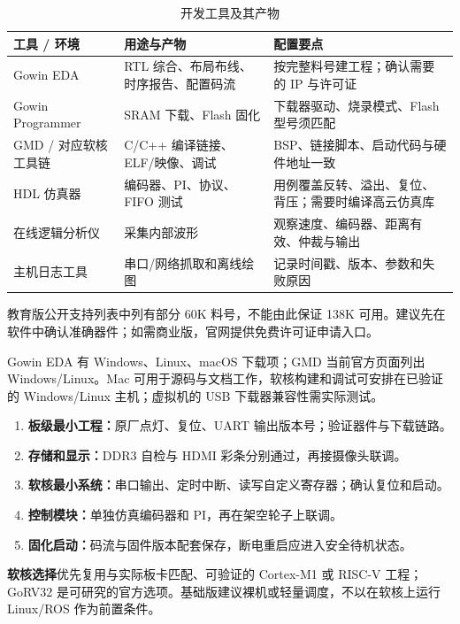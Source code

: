 \documentclass[UTF8,a4paper,zihao=-4,fontset=fandol]{ctexart}
\newcommand{\note}[2]{\par\smallskip\noindent\colorbox{Pale}{\parbox{\dimexpr\linewidth-2\fboxsep\relax}{\small\textbf{\color{Teal}#1}\quad #2}}\par\smallskip}
\begin{document}
\begin{table}[H]\small
\caption{开发工具及其产物}
\begin{tabularx}{\linewidth}{@{}L{3.4cm}Y Y@{}}\toprule
\textbf{工具 / 环境} & \textbf{用途与产物} & \textbf{配置要点}\\\midrule
Gowin EDA & RTL 综合、布局布线、时序报告、配置码流 & 按完整料号建工程；确认需要的 IP 与许可证\\
Gowin Programmer & SRAM 下载、Flash 固化 & 下载器驱动、烧录模式、Flash 型号须匹配\\
GMD / 对应软核工具链 & C/C++ 编译链接、ELF/映像、调试 & BSP、链接脚本、启动代码与硬件地址一致\\
HDL 仿真器 & 编码器、PI、协议、FIFO 测试 & 用例覆盖反转、溢出、复位、背压；需要时编译高云仿真库\\
在线逻辑分析仪 & 采集内部波形 & 观察速度、编码器、距离有效、仲裁与输出\\
主机日志工具 & 串口/网络抓取和离线绘图 & 记录时间戳、版本、参数和失败原因\\\bottomrule
\end{tabularx}
\end{table}

教育版公开支持列表中列有部分 60K 料号，不能由此保证 138K 可用。建议先在软件中确认准确器件；如需商业版，官网提供免费许可证申请入口。\cite{education,eda}

Gowin EDA 有 Windows、Linux、macOS 下载项；GMD 当前官方页面列出 Windows/Linux。Mac 可用于源码与文档工作，软核构建和调试可安排在已验证的 Windows/Linux 主机；虚拟机的 USB 下载器兼容性需实际测试。\cite{eda,gmd}

\begin{enumerate}
\item \textbf{板级最小工程：}原厂点灯、复位、UART 输出版本号；验证器件与下载链路。
\item \textbf{存储和显示：}DDR3 自检与 HDMI 彩条分别通过，再接摄像头联调。
\item \textbf{软核最小系统：}串口输出、定时中断、读写自定义寄存器；确认复位和启动。
\item \textbf{控制模块：}单独仿真编码器和 PI，再在架空轮子上联调。
\item \textbf{固化启动：}码流与固件版本配套保存，断电重启应进入安全待机状态。
\end{enumerate}

\note{软核选择}{优先复用与实际板卡匹配、可验证的 Cortex-M1 或 RISC-V 工程；GoRV32 是可研究的官方选项。基础版建议裸机或轻量调度，不以在软核上运行 Linux/ROS 作为前置条件。\cite{gorv}}
\end{document}
